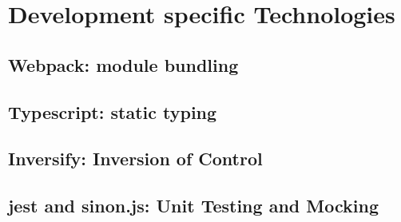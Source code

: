 \section{Development specific Technologies}
\subsection{Webpack: module bundling}
\subsection{Typescript: static typing}
\subsection{Inversify: Inversion of Control}
\subsection{jest and sinon.js: Unit Testing and Mocking}